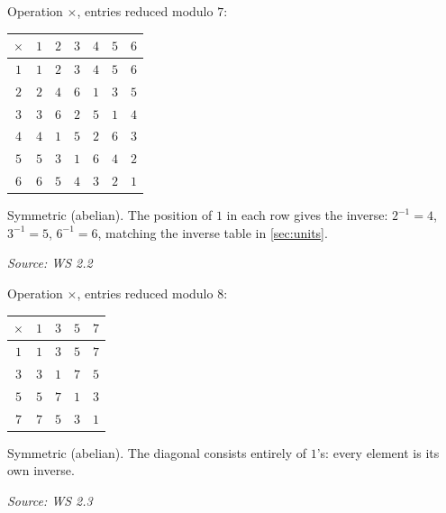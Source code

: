 \documentclass[11pt]{report}
\newcommand{\srcline}[1]{\par\hfill{\footnotesize\textit{Source: #1}}}
\begin{document}
\begin{exbox}[{Table of $U_7$}]\label{ex:table-u7}
Operation $\times$, entries reduced modulo $7$:
\begin{center}
\begin{tabular}{c|cccccc}
$\times$ & $1$ & $2$ & $3$ & $4$ & $5$ & $6$ \\ \hline
$1$ & $1$ & $2$ & $3$ & $4$ & $5$ & $6$ \\
$2$ & $2$ & $4$ & $6$ & $1$ & $3$ & $5$ \\
$3$ & $3$ & $6$ & $2$ & $5$ & $1$ & $4$ \\
$4$ & $4$ & $1$ & $5$ & $2$ & $6$ & $3$ \\
$5$ & $5$ & $3$ & $1$ & $6$ & $4$ & $2$ \\
$6$ & $6$ & $5$ & $4$ & $3$ & $2$ & $1$
\end{tabular}
\end{center}
Symmetric (abelian). The position of $1$ in each row gives the inverse: $2^{-1} = 4$, $3^{-1} = 5$, $6^{-1} = 6$, matching the inverse table in \ref{sec:units}.
\srcline{WS 2.2}
\end{exbox}

\begin{exbox}[{Table of $U_8$}]\label{ex:table-u8}
Operation $\times$, entries reduced modulo $8$:
\begin{center}
\begin{tabular}{c|cccc}
$\times$ & $1$ & $3$ & $5$ & $7$ \\ \hline
$1$ & $1$ & $3$ & $5$ & $7$ \\
$3$ & $3$ & $1$ & $7$ & $5$ \\
$5$ & $5$ & $7$ & $1$ & $3$ \\
$7$ & $7$ & $5$ & $3$ & $1$
\end{tabular}
\end{center}
Symmetric (abelian). The diagonal consists entirely of $1$'s: every element is its own inverse.
\srcline{WS 2.3}
\end{exbox}
\end{document}
